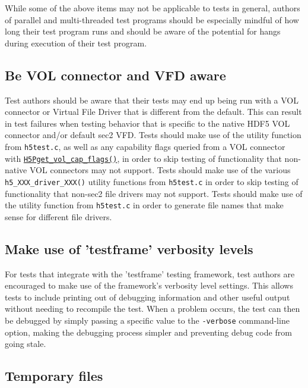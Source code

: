 \documentclass[../HDF5_RFC.tex]{subfiles}
\begin{document}
While some of the above items may not be applicable to tests in general, authors of parallel and
multi-threaded test programs should be especially mindful of how long their test program runs and
should be aware of the potential for hangs during execution of their test program.

\subsection{Be VOL connector and VFD aware}

Test authors should be aware that their tests may end up being run with a VOL connector or Virtual File
Driver that is different from the default. This can result in test failures when testing behavior that
is specific to the native HDF5 VOL connector and/or default sec2 VFD. Tests should make use of the
 utility function from \texttt{h5test.c}, as well as any capability
flags queried from a VOL connector with \href{https://support.hdfgroup.org/documentation/hdf5/latest/group___f_a_p_l.html#ga2ad4dc5c6e5e4271334a7b1c6ee0777d}{\texttt{H5Pget\_vol\_cap\_flags()}}, in order to skip testing of functionality that non-native VOL connectors may not support. Tests should make use of the various \texttt{h5\_XXX\_driver\_XXX()} utility functions from \texttt{h5test.c} in order to skip testing of 
functionality that non-sec2 file drivers may not support. Tests should make use of the  utility function from \texttt{h5test.c} in order to generate file names that
make sense for different file drivers.

\subsection{Make use of 'testframe' verbosity levels}

For tests that integrate with the 'testframe' testing framework, test authors are encouraged to make use
of the framework's verbosity level settings. This allows tests to include printing out of debugging
information and other useful output without needing to recompile the test. When a problem occurs, the test
can then be debugged by simply passing a specific value to the \texttt{-verbose} command-line option,
making the debugging process simpler and preventing debug code from going stale.

\subsection{Temporary files}
\end{document}
